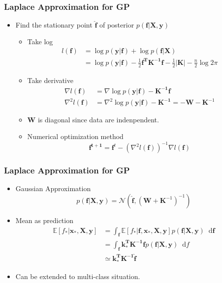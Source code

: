 \documentclass{beamer}
\newcommand*\diff{\mathop{}\!\mathrm{d}}
\begin{document}
\begin{frame}
	\frametitle{Laplace Approximation for GP}
	\begin{itemize}
	\item Find the stationary point $\hat{\bm{f}}$ of posterior $p(\bm{f|X,y})$
		\begin{itemize}
			\item Take log
			\begin{align*}
			l(\bm{f}) & = \log p(\bm{y|f}) + \log p(\bm{f|X}) \\
			& = \log p(\bm{y|f}) - \frac{1}{2}\bm{f^T K^{-1} f} - \frac{1}{2}|\bm{K}|-\frac{n}{2}\log 2\pi
			\end{align*}
			\item Take derivative
			\begin{align*}
			\nabla l(\bm{f}) & = \nabla \log p(\bm{y|f}) - \bm{K^{-1}}\bm{f} \\
			\nabla^2 l(\bm{f}) &= \nabla^2 \log p(\bm{y|f}) - \bm{K^{-1}} = -\bm{W} - \bm{K}^{-1}			
			\end{align*}
			\item $\bm{W}$ is diagonal since data are indenpendent.
			\item Numerical optimization method
			\[
			\bm{f^{t+1}} = \bm{f}^t - (\nabla^2 l(\bm{f}))^{-1} \nabla l(\bm{f})
			\]
		\end{itemize}
	\end{itemize}
\end{frame}
\begin{frame}
	\frametitle{Laplace Approximation for GP}
	\begin{itemize}
		\item Gaussian Approximation
		\[
		p(\bm{f|X,y}) = \mathcal{N}(\hat{\bm{f}}, (\bm{W} + \bm{K}^{-1})^{-1})
		\]
		\item Mean as prediction
		\begin{align*}
		\mathbb{E}[f_*|\bm{x_*, X, y}] & = \int_{\bm{f}} \mathbb{E}[f_*|\bm{f, x_*, X, y}]p(\bm{f|X,y}) \diff \bm{f} \\
		& = \int_{\bm{f}} \bm{k_*^T K^{-1} f} p(\bm{f|X,y}) \diff f \\
		& \simeq \bm{k_*^T K^{-1} \hat{f}}
		\end{align*}
		\item Can be extended to multi-class situation.
	\end{itemize}
\end{frame}
\end{document}
